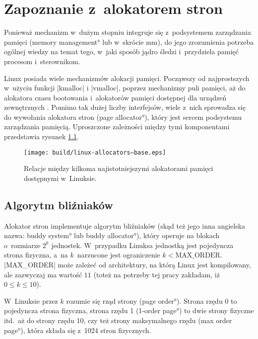 \chapter{Zapoznanie z~alokatorem stron}

Ponieważ mechanizm  w~dużym stopniu integruje się  z~podsystemem
zarządzania pamięci (\ang{memory management} lub w~skrócie mm), do
jego zrozumienia potrzeba ogólnej wiedzy na temat tego, w~jaki sposób
jądro śledzi i~przydziela pamięć procesom i~sterownikom.

Linux posiada wiele mechanizmów alokacji pamięci.  Począwszy od
najprostszych w~użyciu funkcji \code|kmalloc| i \code|vmalloc|,
poprzez mechanizmy puli pamięci, aż do alokatora czasu bootowania
i~alokatorów pamięci dostępnej dla urządzeń zewnętrznych
\autocite[rozdział 8]{bib:ldd3}.  Pomimo tak dużej liczby interfejsów,
wiele z~nich sprowadza się do wywołania alokatora stron (\ang{page
  allocator}), który jest sercem podsystemu zarządzania pamięcią.
Uproszczone zależności między tymi komponentami przedstawia rysunek
\ref{fig:allocators-base}.

\begin{figure}[h]
  \centering
  \texttt{[image: build/linux-allocators--base.eps]}
  \caption[Alokatory dostępne w~jądrze Linux.]{Relacje między kilkoma
    najistotniejszymi alokatorami pamięci dostępnymi w~Linuksie.}
  \label{fig:allocators-base}
\end{figure}

\section{Algorytm bliźniaków}

Alokator stron implementuje algorytm bliźniaków (skąd też jego inna
angielska nazwa: \ang*{buddy system} lub \ang*{buddy allocator}),
który operuje na blokach o~rozmiarze $2^k$ jednostek.  W~przypadku
Linuksa jednostką jest pojedyncza strona fizyczna, a~na $k$~narzucone
jest ograniczenie $k < \mathrm{MAX\_ORDER}$.  \code|MAX_ORDER| może
zależeć od architektury, na którą Linux jest kompilowany, ale
zazwyczaj ma wartość $11$ (toteż na potrzeby tej pracy zakładam, iż $0
\le k \le 10$).

W~Linuksie przez $k$ rozumie się rząd strony (\ang{page order}).
Strona rzędu 0 to pojedyncza strona fizyczna, strona rzędu 1
(\ang{1-order page}) to dwie strony fizyczne itd.\ aż do strony rzędu
10, czy też strony maksymalnego rzędu (\ang{max order page}), która
składa się z~1024 stron fizycznych.

